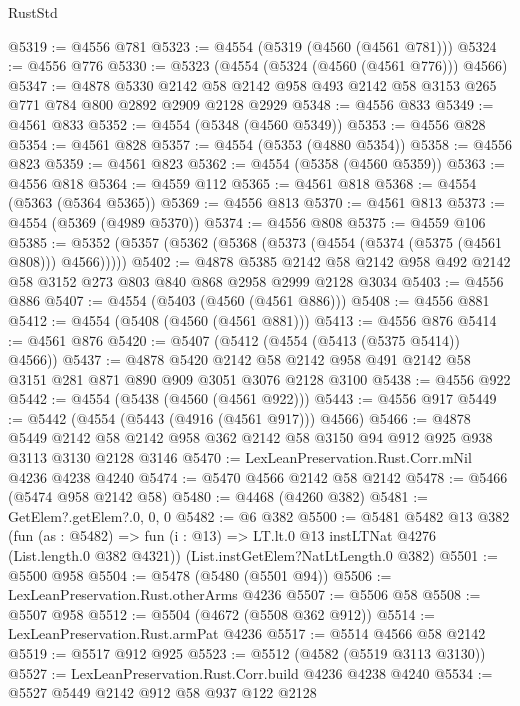 \begin{lexlean}{RustStd}
\begin{coremodule}
{\begin{coremodule}
{{{{{{{{{{{{{{{{@5319 := @4556 @781
@5323 := @4554 (@5319 (@4560 (@4561 @781)))
@5324 := @4556 @776
@5330 := @5323 (@4554 (@5324 (@4560 (@4561 @776))) @4566)
@5347 := @4878
    @5330
    @2142
    @58
    @2142
    @958
    @493
    @2142
    @58
    @3153
    @265
    @771
    @784
    @800
    @2892
    @2909
    @2128
    @2929
@5348 := @4556 @833
@5349 := @4561 @833
@5352 := @4554 (@5348 (@4560 @5349))
@5353 := @4556 @828
@5354 := @4561 @828
@5357 := @4554 (@5353 (@4880 @5354))
@5358 := @4556 @823
@5359 := @4561 @823
@5362 := @4554 (@5358 (@4560 @5359))
@5363 := @4556 @818
@5364 := @4559 @112
@5365 := @4561 @818
@5368 := @4554 (@5363 (@5364 @5365))
@5369 := @4556 @813
@5370 := @4561 @813
@5373 := @4554 (@5369 (@4989 @5370))
@5374 := @4556 @808
@5375 := @4559 @106
@5385 := @5352 (@5357 (@5362 (@5368 (@5373 (@4554 (@5374 (@5375 (@4561 @808))) @4566)))))
@5402 := @4878
    @5385
    @2142
    @58
    @2142
    @958
    @492
    @2142
    @58
    @3152
    @273
    @803
    @840
    @868
    @2958
    @2999
    @2128
    @3034
@5403 := @4556 @886
@5407 := @4554 (@5403 (@4560 (@4561 @886)))
@5408 := @4556 @881
@5412 := @4554 (@5408 (@4560 (@4561 @881)))
@5413 := @4556 @876
@5414 := @4561 @876
@5420 := @5407 (@5412 (@4554 (@5413 (@5375 @5414)) @4566))
@5437 := @4878
    @5420
    @2142
    @58
    @2142
    @958
    @491
    @2142
    @58
    @3151
    @281
    @871
    @890
    @909
    @3051
    @3076
    @2128
    @3100
@5438 := @4556 @922
@5442 := @4554 (@5438 (@4560 (@4561 @922)))
@5443 := @4556 @917
@5449 := @5442 (@4554 (@5443 (@4916 (@4561 @917))) @4566)
@5466 := @4878
    @5449
    @2142
    @58
    @2142
    @958
    @362
    @2142
    @58
    @3150
    @94
    @912
    @925
    @938
    @3113
    @3130
    @2128
    @3146
@5470 := LexLeanPreservation.Rust.Corr.mNil @4236 @4238 @4240
@5474 := @5470 @4566 @2142 @58 @2142
@5478 := @5466 (@5474 @958 @2142 @58)
@5480 := @4468 (@4260 @382)
@5481 := GetElem?.getElem?.{0, 0, 0}
@5482 := @6 @382
@5500 := @5481
    @5482
    @13
    @382
    (fun (as : @5482) =>
    fun (i : @13) => LT.lt.{0} @13 instLTNat @4276 (List.length.{0} @382 @4321))
    (List.instGetElem?NatLtLength.{0} @382)
@5501 := @5500 @958
@5504 := @5478 (@5480 (@5501 @94))
@5506 := LexLeanPreservation.Rust.otherArms @4236
@5507 := @5506 @58
@5508 := @5507 @958
@5512 := @5504 (@4672 (@5508 @362 @912))
@5514 := LexLeanPreservation.Rust.armPat @4236
@5517 := @5514 @4566 @58 @2142
@5519 := @5517 @912 @925
@5523 := @5512 (@4582 (@5519 @3113 @3130))
@5527 := LexLeanPreservation.Rust.Corr.build @4236 @4238 @4240
@5534 := @5527 @5449 @2142 @912 @58 @937 @122 @2128
}}}}}}}}}}}}}}}}
\end{coremodule}}
\end{coremodule}
\end{lexlean}

